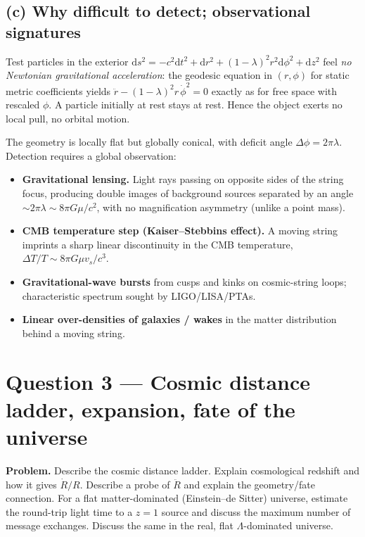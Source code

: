 \documentclass[11pt]{article}
\newcommand{\de}{\mathrm{d}}
\begin{document}
\subsection*{(c) Why difficult to detect; observational signatures}

Test particles in the exterior $\de s^2 = -c^2\de t^2 + \de r^2 + (1-\lambda)^2 r^2\de\phi^2 + \de z^2$ feel \emph{no Newtonian gravitational acceleration}: the geodesic equation in $(r,\phi)$ for static metric coefficients yields $\ddot r - (1-\lambda)^2 r\,\dot\phi^2 = 0$ exactly as for free space with rescaled $\phi$. A particle initially at rest stays at rest. Hence the object exerts no local pull, no orbital motion.

The geometry is locally flat but globally conical, with deficit angle $\Delta\phi = 2\pi\lambda$. Detection requires a global observation:

\begin{itemize}
  \item \textbf{Gravitational lensing.} Light rays passing on opposite sides of the string focus, producing double images of background sources separated by an angle $\sim 2\pi\lambda \sim 8\pi G\mu/c^2$, with no magnification asymmetry (unlike a point mass).
  \item \textbf{CMB temperature step (Kaiser--Stebbins effect).} A moving string imprints a sharp linear discontinuity in the CMB temperature, $\Delta T/T \sim 8\pi G\mu v_s/c^3$.
  \item \textbf{Gravitational-wave bursts} from cusps and kinks on cosmic-string loops; characteristic spectrum sought by LIGO/LISA/PTAs.
  \item \textbf{Linear over-densities of galaxies / wakes} in the matter distribution behind a moving string.
\end{itemize}

\section*{Question 3 --- Cosmic distance ladder, expansion, fate of the universe}

\textbf{Problem.} Describe the cosmic distance ladder. Explain cosmological redshift and how it gives $\dot R/R$. Describe a probe of $\ddot R$ and explain the geometry/fate connection. For a flat matter-dominated (Einstein--de Sitter) universe, estimate the round-trip light time to a $z=1$ source and discuss the maximum number of message exchanges. Discuss the same in the real, flat $\Lambda$-dominated universe.
\end{document}
